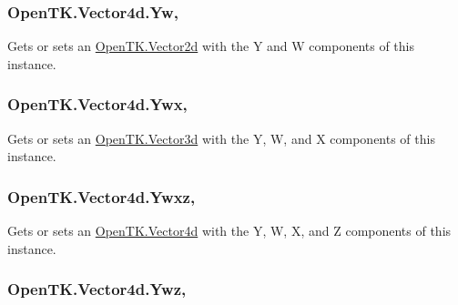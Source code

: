 \hypertarget{struct_open_t_k_1_1_vector4d_a2568d72f35a644ab2e84e73332934492}{
\subsubsection[{Yw}]{ Open\-T\-K.\-Vector4d.\-Yw\hspace{0.3cm}{\ttfamily [get]}, {\ttfamily [set]}}}\label{struct_open_t_k_1_1_vector4d_a2568d72f35a644ab2e84e73332934492}


Gets or sets an \hyperlink{struct_open_t_k_1_1_vector2d}{Open\-T\-K.\-Vector2d} with the Y and W components of this instance. 

\hypertarget{struct_open_t_k_1_1_vector4d_a38f8506812c576ba282db5354f07fbd0}{
\subsubsection[{Ywx}]{ Open\-T\-K.\-Vector4d.\-Ywx\hspace{0.3cm}{\ttfamily [get]}, {\ttfamily [set]}}}\label{struct_open_t_k_1_1_vector4d_a38f8506812c576ba282db5354f07fbd0}


Gets or sets an \hyperlink{struct_open_t_k_1_1_vector3d}{Open\-T\-K.\-Vector3d} with the Y, W, and X components of this instance. 

\hypertarget{struct_open_t_k_1_1_vector4d_af6740e2c7d8371dc35017cbdd02cda33}{
\subsubsection[{Ywxz}]{ Open\-T\-K.\-Vector4d.\-Ywxz\hspace{0.3cm}{\ttfamily [get]}, {\ttfamily [set]}}}\label{struct_open_t_k_1_1_vector4d_af6740e2c7d8371dc35017cbdd02cda33}


Gets or sets an \hyperlink{struct_open_t_k_1_1_vector4d}{Open\-T\-K.\-Vector4d} with the Y, W, X, and Z components of this instance. 

\hypertarget{struct_open_t_k_1_1_vector4d_af37c99e4b4ea8c9d6592af05c4375d74}{
\subsubsection[{Ywz}]{ Open\-T\-K.\-Vector4d.\-Ywz\hspace{0.3cm}{\ttfamily [get]}, {\ttfamily [set]}}}\label{struct_open_t_k_1_1_vector4d_af37c99e4b4ea8c9d6592af05c4375d74}


